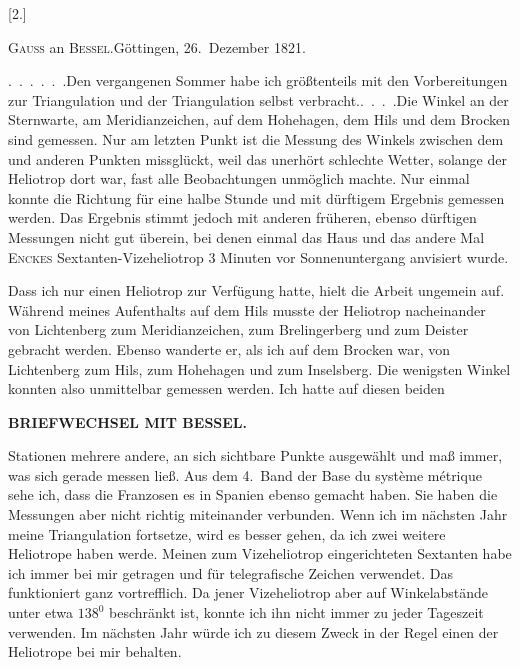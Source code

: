 \begin{center}
[2.]\par\medskip
\textsc{Gauss} an \textsc{Bessel}.\quad Göttingen, 26.~Dezember 1821.
\end{center}

\par\noindent\hspace*{\parindent}.\ .\ .\ .\ .\ .\quad Den vergangenen Sommer habe ich größtenteils mit den Vorbereitungen zur Triangulation und der Triangulation selbst verbracht.\quad.\ .\ .\ .\quad Die Winkel an der Sternwarte, am Meridianzeichen, auf dem Hohehagen, dem Hils und dem Brocken sind gemessen. Nur am letzten Punkt ist die Messung des Winkels zwischen dem  und anderen Punkten missglückt, weil das unerhört schlechte Wetter, solange der Heliotrop dort war, fast alle Beobachtungen unmöglich machte.
Nur einmal konnte die Richtung für eine halbe Stunde und mit dürftigem Ergebnis gemessen werden. Das Ergebnis stimmt jedoch mit anderen früheren, ebenso dürftigen Messungen nicht gut überein, bei denen einmal das Haus und das andere Mal \textsc{Enckes} Sextanten-Vizeheliotrop 3 Minuten vor Sonnenuntergang anvisiert wurde.

\par\noindent\hspace*{\parindent}Dass ich nur einen Heliotrop zur Verfügung hatte, hielt die Arbeit ungemein auf.
Während meines Aufenthalts auf dem Hils musste der Heliotrop nacheinander von Lichtenberg zum Meridianzeichen, zum Brelingerberg und zum Deister gebracht werden. Ebenso wanderte er, als ich auf dem Brocken war, von Lichtenberg zum Hils, zum Hohehagen und zum Inselsberg.
Die wenigsten Winkel konnten also unmittelbar gemessen werden. Ich hatte auf diesen beiden
\par\clearpage
{}\hfill{\small\textbf{BRIEFWECHSEL MIT BESSEL.}}\par\medskip
\noindent Stationen mehrere andere, an sich sichtbare Punkte ausgewählt und maß immer, was sich gerade messen ließ.
Aus dem 4.~Band der Base du système métrique sehe ich, dass die Franzosen es in Spanien ebenso gemacht haben. Sie haben die Messungen aber nicht richtig miteinander verbunden.
Wenn ich im nächsten Jahr meine Triangulation fortsetze, wird es besser gehen, da ich zwei weitere Heliotrope haben werde.
Meinen zum Vizeheliotrop eingerichteten Sextanten habe ich immer bei mir getragen und für telegrafische Zeichen verwendet.
Das funktioniert ganz vortrefflich. Da jener Vizeheliotrop aber auf Winkelabstände unter etwa \(138^{0}\) beschränkt ist, konnte ich ihn nicht immer zu jeder Tageszeit verwenden. Im nächsten Jahr würde ich zu diesem Zweck in der Regel einen der Heliotrope bei mir behalten.

